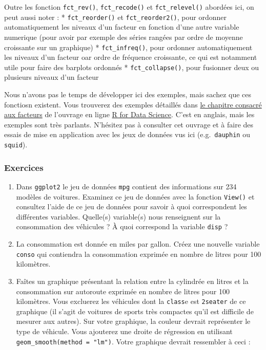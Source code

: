 \documentclass[a4paperpaper,]{article}
\theoremstyle{definition}
\theoremstyle{definition}
\theoremstyle{definition}
\theoremstyle{remark}
\begin{document}
Outre les fonction \texttt{fct\_rev()}, \texttt{fct\_recode()} et
\texttt{fct\_relevel()} abordées ici, on peut aussi noter : *
\texttt{fct\_reorder()} et \texttt{fct\_reorder2()}, pour ordonner
automatiquement les niveaux d'un facteur en fonction d'une autre
variable numerique (pour avoir par exemple des séries rangées par ordre
de moyenne croissante sur un graphique) * \texttt{fct\_infreq()}, pour
ordonner automatiquement les niveaux d'un facteur oar ordre de fréquence
croissante, ce qui est notamment utile pour faire des barplots ordonnés
* \texttt{fct\_collapse()}, pour fusionner deux ou plusieurs niveaux
d'un facteur

Nous n'avons pas le temps de développer ici des exemples, mais sachez
que ces fonctiosn existent. Vous trouverez des exemples détaillés dans
\href{http://r4ds.had.co.nz/factors.html\#modifying-factor-levels}{le
chapitre consacré aux facteurs} de l'ouvrage en ligne
\href{http://r4ds.had.co.nz/}{R for Data Science}. C'est en anglais,
mais les exemples sont très parlants. N'hésitez pas à consulter cet
ouvrage et à faire des essais de mise en application avec les jeux de
données vus ici (e.g.~\texttt{dauphin} ou \texttt{squid}).

\hypertarget{exercices-10}{%
\subsubsection{Exercices}\label{exercices-10}}

\begin{enumerate}
\def\labelenumi{\arabic{enumi}.}
\item
  Dans \texttt{ggplot2} le jeu de données \texttt{mpg} contient des
  informations sur 234 modèles de voitures. Examinez ce jeu de données
  avec la fonction \texttt{View()} et consultez l'aide de ce jeu de
  données pour savoir à quoi correspondent les différentes variables.
  Quelle(s) variable(s) nous renseignent sur la consommation des
  véhicules ? À quoi correspond la variable \texttt{disp} ?
\item
  La consommation est donnée en miles par gallon. Créez une nouvelle
  variable \texttt{conso} qui contiendra la consommation exprimée en
  nombre de litres pour 100 kilomètres.
\item
  Faîtes un graphique présentant la relation entre la cylindrée en
  litres et la consommation sur autoroute exprimée en nombre de litres
  pour 100 kilomètres. Vous excluerez les véhicules dont la
  \texttt{class}e est \texttt{2seater} de ce graphique (il s'agit de
  voitures de sports très compactes qu'il est difficile de mesurer aux
  autres). Sur votre graphique, la couleur devrait représenter le type
  de véhicule. Vous ajouterez une droite de régression en utilisant
  \texttt{geom\_smooth(method\ =\ "lm")}. Votre graphique devrait
  ressembler à ceci :
\end{enumerate}
\end{document}
